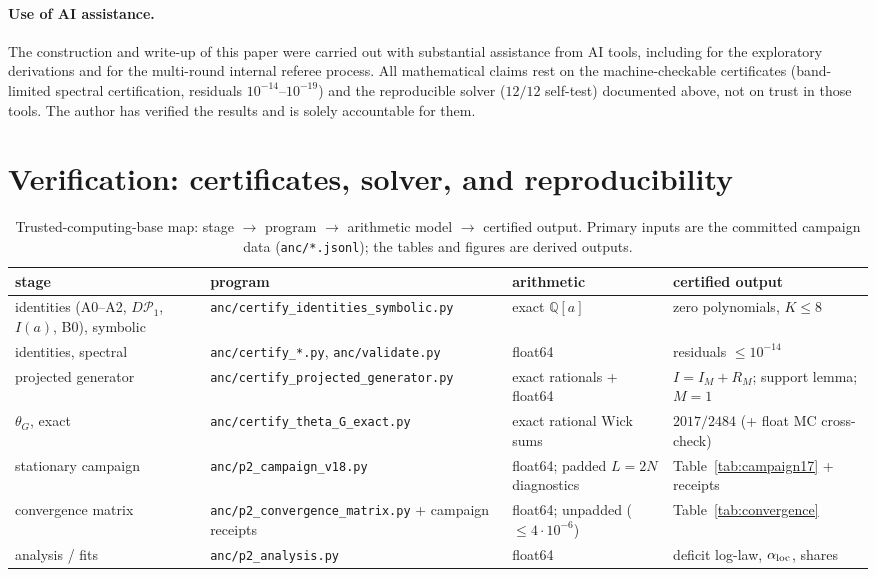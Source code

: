 \documentclass[11pt]{article}
\theoremstyle{remark}
\theoremstyle{plain}
\begin{document}
\paragraph{Use of AI assistance.} The construction and write-up of this paper were
carried out with substantial assistance from AI tools, including for the exploratory
derivations and for the multi-round internal referee process. All mathematical claims
rest on the machine-checkable certificates (band-limited spectral certification, residuals
$10^{-14}$--$10^{-19}$) and the reproducible solver ($12/12$ self-test) documented above,
not on trust in those tools. The author has verified the results and is solely accountable
for them.

\appendix
\section{Verification: certificates, solver, and reproducibility}\label{app:verification}

\begin{table}[htbp]
\centering\small
\caption{Trusted-computing-base map: stage $\to$ program $\to$ arithmetic model $\to$
certified output. Primary inputs are the committed campaign data
(\texttt{anc/*.jsonl}); the tables and figures are derived outputs.}
\label{tab:tcb}
\begin{tabular}{p{} p{} p{} p{}}
\hline
stage & program & arithmetic & certified output \\
\hline
identities (A0--A2, $D\mathcal{P}_1$, $I(a)$, B0), symbolic & \texttt{anc/certify\_identities\_symbolic.py} & exact $\mathbb{Q}[a]$ & zero polynomials, $K \le 8$ \\
identities, spectral & \texttt{anc/certify\_*.py}, \texttt{anc/validate.py} & float64 & residuals $\le 10^{-14}$ \\
projected generator & \texttt{anc/certify\_projected\_generator.py} & exact rationals + float64 & $I = I_M + R_M$; support lemma; $M{=}1$ \\
$\theta_G$, exact & \texttt{anc/certify\_theta\_G\_exact.py} & exact rational Wick sums & $2017/2484$ (+ float MC cross-check) \\
stationary campaign & \texttt{anc/p2\_campaign\_v18.py} & float64; padded $L=2N$ diagnostics & Table~\ref{tab:campaign17} + receipts \\
convergence matrix & \texttt{anc/p2\_convergence\_matrix.py} + campaign receipts & float64; unpadded ($\le 4\cdot10^{-6}$) & Table~\ref{tab:convergence} \\
analysis / fits & \texttt{anc/p2\_analysis.py} & float64 & deficit log-law, $\alpha_{\rm loc}$, shares \\
\hline
\end{tabular}
\end{table}
\end{document}
